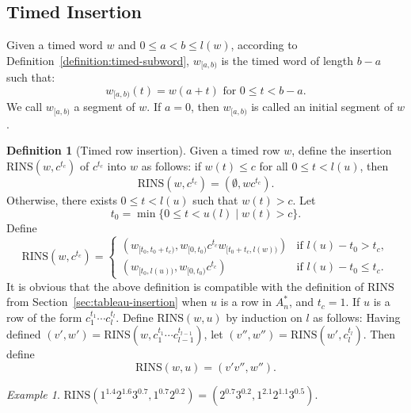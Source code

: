 \documentclass[10pt]{amsproc}
\theoremstyle{definition}
\newtheorem{definition}[theorem]{Definition}
\theoremstyle{remark}
\newtheorem{example}[theorem]{Example}
\newcommand{\rowins}{\mathrm{RINS}}
\begin{document}
\subsection{Timed Insertion}
\label{sec:timed-insertion}
Given a timed word $w$ and $0\leq a < b \leq l(w)$, according to Definition~\ref{definition:timed-subword}, $w_{[a, b)}$ is the timed word of length $b-a$ such that:
\begin{displaymath}
  w_{[a, b)}(t) = w(a+ t) \text{ for } 0\leq t<b-a.
\end{displaymath}
We call $w_{[a,b)}$ a segment of $w$.
If $a=0$, then $w_{[a,b)}$ is called an initial segment of $w$.
\begin{definition}[Timed row insertion]
  \label{definition:timed-row-insertion}
  Given a timed row $w$, define the insertion $\rowins(w, c^{t_c})$ of $c^{t_c}$ into $w$ as follows: if $w(t)\leq c$ for all $0\leq t < l(u)$, then
  \begin{displaymath}
    \rowins(w, c^{t_c}) = (\emptyset, wc^{t_c}).
  \end{displaymath}
  Otherwise, there exists $0\leq t < l(u)$ such that $w(t)>c$.
  Let
  \begin{displaymath}
    t_0 = \min\{0\leq t< u(l)\mid w(t)> c\}.
  \end{displaymath}
  Define
  \begin{displaymath}
    \rowins(w, c^{t_c}) =
    \begin{cases}
      (w_{[t_0, t_0+t_c)}, w_{[0, t_0)}c^{t_c} w_{[t_0+t_c, l(w))}) & \text{if } l(u) - t_0 > t_c,\\
      (w_{[t_0, l(u))}, w_{[0, t_0)} c^{t_c}) & \text{if } l(u) - t_0 \leq t_c.
    \end{cases}
  \end{displaymath}
  It is obvious that the above definition is compatible with the definition of $\rowins$ from Section~\ref{sec:tableau-insertion} when $u$ is a row in $A_n^*$, and $t_c=1$.
  If $u$ is a row of the form $c_1^{t_1}\dotsb c_l^{t_l}$.
  Define $\rowins(w,u)$ by induction on $l$ as follows:
  Having defined $(v',w')=\rowins(w,c_1^{t_1}\dotsb c_{l-1}^{t_{l-1}})$,
  let $(v'',w'')=\rowins(w',c_l^{t_l})$.
  Then define
  \begin{displaymath}
    \rowins(w,u) = (v'v'', w'').
  \end{displaymath}
\end{definition}
\begin{example}
  \label{example:timed-row-ins}
  $\rowins(1^{1.4}2^{1.6}3^{0.7},1^{0.7}2^{0.2})=(2^{0.7}3^{0.2},1^{2.1}2^{1.1}3^{0.5})$.
\end{example}
\end{document}

